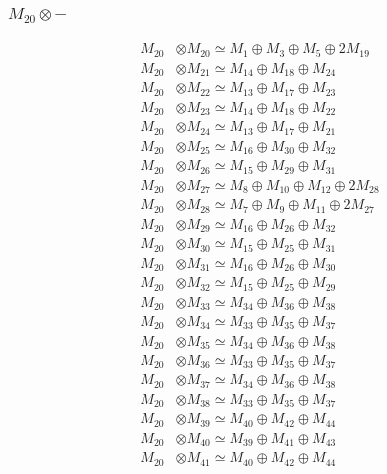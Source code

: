 \subsubsection{$ M_{20}\otimes -$}
\begin{align*}
M_{20} &\otimes M_{20} \simeq M_{1} \oplus M_{3} \oplus M_{5} \oplus 2M_{19} \\
M_{20} &\otimes M_{21} \simeq M_{14} \oplus M_{18} \oplus M_{24} \\
M_{20} &\otimes M_{22} \simeq M_{13} \oplus M_{17} \oplus M_{23} \\
M_{20} &\otimes M_{23} \simeq M_{14} \oplus M_{18} \oplus M_{22} \\
M_{20} &\otimes M_{24} \simeq M_{13} \oplus M_{17} \oplus M_{21} \\
M_{20} &\otimes M_{25} \simeq M_{16} \oplus M_{30} \oplus M_{32} \\
M_{20} &\otimes M_{26} \simeq M_{15} \oplus M_{29} \oplus M_{31} \\
M_{20} &\otimes M_{27} \simeq M_{8} \oplus M_{10} \oplus M_{12} \oplus 2M_{28} \\
M_{20} &\otimes M_{28} \simeq M_{7} \oplus M_{9} \oplus M_{11} \oplus 2M_{27} \\
M_{20} &\otimes M_{29} \simeq M_{16} \oplus M_{26} \oplus M_{32} \\
M_{20} &\otimes M_{30} \simeq M_{15} \oplus M_{25} \oplus M_{31} \\
M_{20} &\otimes M_{31} \simeq M_{16} \oplus M_{26} \oplus M_{30} \\
M_{20} &\otimes M_{32} \simeq M_{15} \oplus M_{25} \oplus M_{29} \\
M_{20} &\otimes M_{33} \simeq M_{34} \oplus M_{36} \oplus M_{38} \\
M_{20} &\otimes M_{34} \simeq M_{33} \oplus M_{35} \oplus M_{37} \\
M_{20} &\otimes M_{35} \simeq M_{34} \oplus M_{36} \oplus M_{38} \\
M_{20} &\otimes M_{36} \simeq M_{33} \oplus M_{35} \oplus M_{37} \\
M_{20} &\otimes M_{37} \simeq M_{34} \oplus M_{36} \oplus M_{38} \\
M_{20} &\otimes M_{38} \simeq M_{33} \oplus M_{35} \oplus M_{37} \\
M_{20} &\otimes M_{39} \simeq M_{40} \oplus M_{42} \oplus M_{44} \\
M_{20} &\otimes M_{40} \simeq M_{39} \oplus M_{41} \oplus M_{43} \\
M_{20} &\otimes M_{41} \simeq M_{40} \oplus M_{42} \oplus M_{44} \\

\end{align*}
